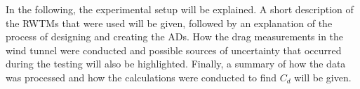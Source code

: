 
In the following, the experimental setup will be explained. A short description of the \gls{RWTM}s that were used will be given, followed by an explanation of the process of designing and creating the \gls{AD}s. How the drag measurements in the wind tunnel were conducted and possible sources of uncertainty that occurred during the testing will also be highlighted. Finally, a summary of how the data was processed and how the calculations were conducted to find $C_d$ will be given. 




